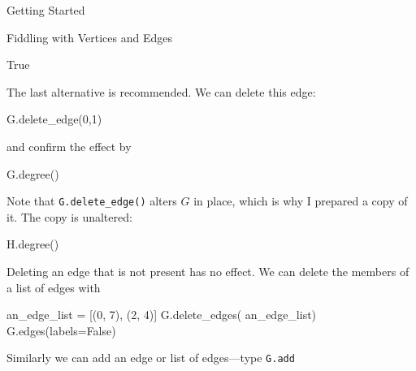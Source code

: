 \begin{chap}{Getting Started}
\begin{sect}{Fiddling with Vertices and Edges}
\begin{sagecode}
\begin{sageoutput}
True
\end{sageoutput}
\end{sagecode}
%
\begin{para}
The last alternative is recommended.
We can delete this edge:
\end{para}
%
\begin{sagecode}
\begin{sageinput}
G.delete_edge(0,1)
\end{sageinput}
\begin{sageoutput}
\end{sageoutput}
\end{sagecode}
%
\begin{para}
and confirm the effect by
\end{para}
%
\begin{sagecode}
\begin{sageinput}
G.degree()
\end{sageinput}
\begin{sageoutput}
[3, 3, 4, 4, 4, 4, 4, 4, 4]
\end{sageoutput}
\end{sagecode}
%
\begin{para}
Note that \verb|G.delete_edge()| alters $G$ in place, which is why I
prepared a copy of it. The copy is unaltered:
\end{para}
%
\begin{sagecode}
\begin{sageinput}
H.degree()
\end{sageinput}
\begin{sageoutput}
[4, 4, 4, 4, 4, 4, 4, 4, 4]
\end{sageoutput}
\end{sagecode}
%
\begin{para}
Deleting an edge that is not present has no effect. We can delete
the members of a list of edges with 
\end{para}
%
\begin{sagecode}
\begin{sageinput}
an_edge_list = [(0, 7), (2, 4)]
G.delete_edges( an_edge_list)
G.edges(labels=False)
\end{sageinput}
\begin{sageoutput}
[(0, 2), (0, 8), (1, 2), (1, 3), 
(1, 8), (2, 3), (3, 4), (3, 5), 
(4, 5), (4, 6), (5, 6), (5, 7), 
(6, 7), (6, 8), (7, 8)]
\end{sageoutput}
\end{sagecode}
%
\begin{para}
Similarly we can add an edge or list of edges---type \verb|G.add|

\end{para}
\end{sect}
\end{chap}
